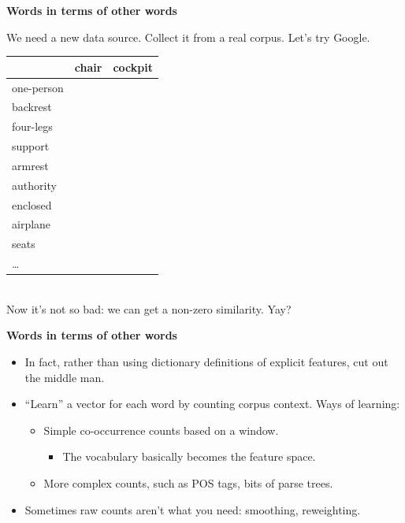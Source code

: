 \documentclass{beamer}
\newcommand{\pagestepalt}[2]{
  \begin{frame}[t]
    \begin{minipage}[t][0.26\textheight][t]{\textwidth}
      \begin{center}
        \huge
        \textbf{#1}
      \end{center}
    \end{minipage}
    
    \begin{minipage}[t][0.7\textheight][c]{\textwidth}
      #2
    \end{minipage}
  \end{frame}
}
\begin{document}
\pagestepalt{Words in terms of other words}{
  We need a new data source.  Collect it from a real corpus.  Let's try Google.\\\pause
  {\small
  \begin{tabular}{|l|l|l|}
    \hline
    & chair & cockpit \\
    \hline
    one-person &  &  \\
    backrest &  &  \\
    four-legs &  &  \\
    support &  &  \\
    armrest &  &  \\
    authority &  & \\
    enclosed &  & \\
    airplane & &  \\
    seats &  &  \\
    \ldots &&\\
    \hline
  \end{tabular}
  }\pause\\
  Now it's not so bad: we can get a non-zero similarity.  Yay?
}

\pagestepalt{Words in terms of other words}{
  \begin{itemize}
  \item In fact, rather than using dictionary definitions of explicit features,
    cut out the middle man.\pause
  \item ``Learn'' a vector for each word by counting corpus context. Ways of learning:
    \begin{itemize}
    \item Simple co-occurrence counts based on a window.
      \begin{itemize}
      \item The vocabulary basically becomes the feature space.
      \end{itemize}\pause
    \item More complex counts, such as POS tags, bits of parse trees.\pause
    \end{itemize}
  \item Sometimes raw counts aren't what you need: smoothing, reweighting.
  \end{itemize}
}
\end{document}
